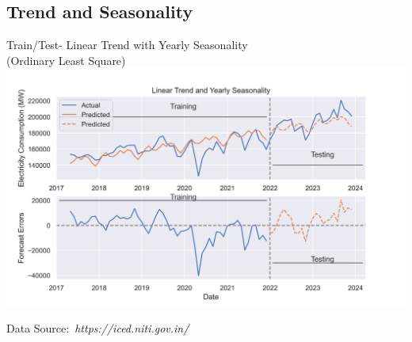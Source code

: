 \documentclass{beamer}
\newcommand{\credit}[1]{\par\hfill \footnotesize Data Source:~\itshape#1}
\begin{document}
\subsection{Trend and Seasonality}
\begin{frame}{Train/Test- Linear Trend with Yearly Seasonality\\(Ordinary Least Square) }
\centering
\includegraphics[width=\linewidth]{images/Monthly_test_train.png}
\credit{https://iced.niti.gov.in/}

\end{frame}
\end{document}
